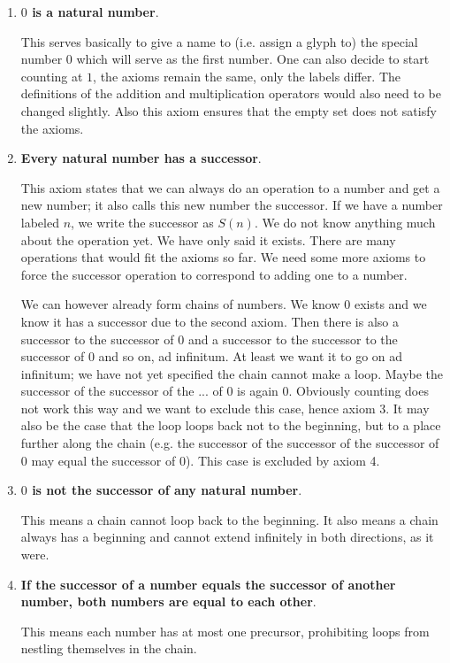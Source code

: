 \begin{enumerate}
\item \textbf{$0$ is a natural number}.

This serves basically to give a name to (i.e. assign a glyph to) the special number $0$ which will serve as the first number. One can also decide to start counting at $1$, the axioms remain the same, only the labels differ. The definitions of the addition and multiplication operators would also need to be changed slightly. Also this axiom ensures that the empty set does not satisfy the axioms.

\item \textbf{Every natural number has a successor}.

This axiom states that we can always do an operation to a number and get a new number; it also calls this new number the successor. If we have a number labeled $n$, we write the successor as $S(n)$. We do not know anything much about the operation yet. We have only said it exists. There are many operations that would fit the axioms so far. We need some more axioms to force the successor operation to correspond to adding one to a number.

We can however already form chains of numbers. We know $0$ exists and we know it has a successor due to the second axiom. Then there is also a successor to the successor of $0$ and a successor to the successor to the successor of $0$ and so on, ad infinitum. At least we want it to go on ad infinitum; we have not yet specified the chain cannot make a loop. Maybe the successor of the successor of the ... of $0$ is again $0$. Obviously counting does not work this way and we want to exclude this case, hence axiom 3. It may also be the case that the loop loops back not to the beginning, but to a place further along the chain (e.g. the successor of the successor of the successor of $0$ may equal the successor of $0$). This case is excluded by axiom 4. 

\item \textbf{$0$ is not the successor of any natural number}.

This means a chain cannot loop back to the beginning. It also means a chain always has a beginning and cannot extend infinitely in both directions, as it were.

\item \textbf{If the successor of a number equals the successor of another number, both numbers are equal to each other}.

This means each number has at most one precursor, prohibiting loops from nestling themselves in the chain.  


\end{enumerate}
